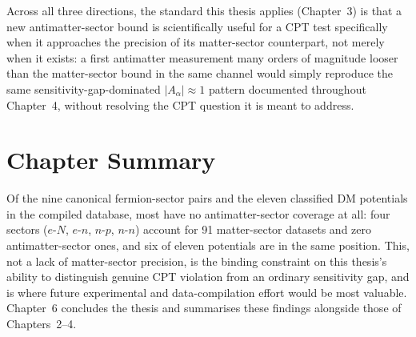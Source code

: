 \documentclass[main]{subfiles}
\begin{document}
Across all three directions, the standard this thesis applies (Chapter~3)
is that a new antimatter-sector bound is scientifically useful for a CPT
test specifically when it approaches the precision of its matter-sector
counterpart, not merely when it exists: a first antimatter measurement many
orders of magnitude looser than the matter-sector bound in the same channel
would simply reproduce the same sensitivity-gap-dominated
$|A_\alpha|\approx1$ pattern documented throughout Chapter~4, without
resolving the CPT question it is meant to address.

\section{Chapter Summary}

Of the nine canonical fermion-sector pairs and the eleven classified DM
potentials in the compiled database, most have no antimatter-sector
coverage at all: four sectors ($e$-$N$, $e$-$n$, $n$-$p$, $n$-$n$) account
for 91 matter-sector datasets and zero antimatter-sector ones, and six of
eleven potentials are in the same position. This, not a lack of
matter-sector precision, is the binding constraint on this thesis's
ability to distinguish genuine CPT violation from an ordinary sensitivity
gap, and is where future experimental and data-compilation effort would be
most valuable. Chapter~6 concludes the thesis and summarises these findings
alongside those of Chapters~2--4.

\end{document}
